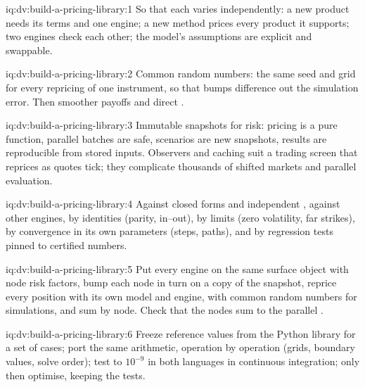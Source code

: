 \begin{solution}{iq:dv:build-a-pricing-library:1}
So that each varies independently: a new product needs its terms and one engine; a new method prices every product it supports; two engines check each other; the
model's assumptions are explicit and swappable.
\end{solution}

\begin{solution}{iq:dv:build-a-pricing-library:2}
Common random numbers: the same seed and grid for every repricing of one instrument, so that bumps difference out the simulation error. Then smoother payoffs and
direct .
\end{solution}

\begin{solution}{iq:dv:build-a-pricing-library:3}
Immutable snapshots for risk: pricing is a pure function, parallel batches are safe, scenarios are new snapshots, results are reproducible from stored inputs.
Observers and caching suit a trading screen that reprices as quotes tick; they complicate thousands of shifted markets and parallel evaluation.
\end{solution}

\begin{solution}{iq:dv:build-a-pricing-library:4}
Against closed forms and independent , against other engines, by identities (parity, in--out), by limits (zero volatility, far strikes), by
convergence in its own parameters (steps, paths), and by regression tests pinned to certified numbers.
\end{solution}

\begin{solution}{iq:dv:build-a-pricing-library:5}
Put every engine on the same surface object with node risk factors, bump each node in turn on a copy of the snapshot, reprice every position with its own model
and engine, with common random numbers for simulations, and sum by node. Check that the nodes sum to the parallel .
\end{solution}

\begin{solution}{iq:dv:build-a-pricing-library:6}
Freeze reference values from the Python library for a set of cases; port the same arithmetic, operation by operation (grids, boundary values, solve order); test
to $10^{-9}$ in both languages in continuous integration; only then optimise, keeping the tests.
\end{solution}
